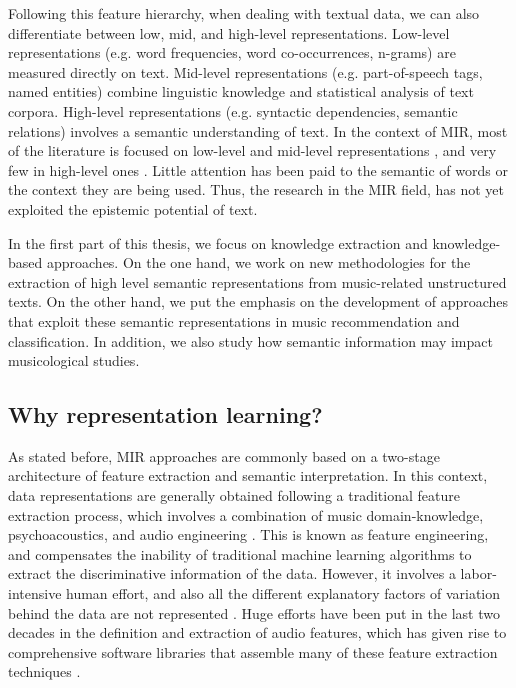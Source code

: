 Following this feature hierarchy, when dealing with textual data, we can also differentiate between low, mid, and high-level representations. Low-level representations (e.g. word frequencies, word co-occurrences, n-grams) are measured directly on text. Mid-level representations (e.g. part-of-speech tags, named entities) combine linguistic knowledge and statistical analysis of text corpora. High-level representations (e.g. syntactic dependencies, semantic relations) involves a semantic understanding of text. In the context of MIR, most of the literature is focused on low-level and mid-level representations \citep{Celma2006,lamere2008social,Whitman2002,Knees2013}, and very few in high-level ones \citep{Tata2010,Knees2011,Sordo2012}. Little attention has been paid to the semantic of words or the context they are being used. Thus, the research in the MIR field, has not yet exploited the epistemic potential of text.

In the first part of this thesis, we focus on knowledge extraction and knowledge-based approaches. On the one hand, we work on new methodologies for the extraction of high level semantic representations from music-related unstructured texts. On the other hand, we put the emphasis on the development of approaches that exploit these semantic representations in music recommendation and classification. In addition, we also study how semantic information may impact musicological studies.

\subsection{Why representation learning?}
\label{sec:intro:learning}

As stated before, MIR approaches are commonly based on a two-stage architecture of feature extraction and semantic interpretation. In this context, data representations are generally obtained following a traditional feature extraction process, which involves a combination of music domain-knowledge, psychoacoustics, and audio engineering \citep{humphrey2012}. 
This is known as feature engineering, and compensates the inability of traditional machine learning algorithms to extract the discriminative information of the data. However, it involves a labor-intensive human effort, and also all the different explanatory factors of variation behind the data are not represented \citep{bengio2013representation}. 
Huge efforts have been put in the last two decades in the definition and extraction of audio features, which has given rise to comprehensive software libraries that assemble many of these feature extraction techniques \citep{Bogdanov2013, Mcfee2015}. 

